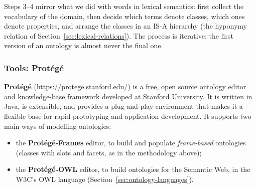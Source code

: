 \begin{nbintuition}
Steps 3--4 mirror what we did with words in lexical semantics: first collect the
vocabulary of the domain, then decide which terms denote classes, which ones denote
properties, and arrange the classes in an IS-A hierarchy (the hyponymy relation of
Section~\ref{sec:lexical-relations}). The process is iterative: the first version of an
ontology is almost never the final one.
\end{nbintuition}

\subsubsection{Tools: Protégé}

\textbf{Protégé} (\url{https://protege.stanford.edu/}) is a free, open source ontology
editor and knowledge-base framework developed at Stanford University. It is written in
Java, is extensible, and provides a plug-and-play environment that makes it a flexible
base for rapid prototyping and application development. It supports two main ways of
modelling ontologies:
\begin{itemize}[nosep]
  \item the \textbf{Protégé-Frames} editor, to build and populate \emph{frame-based}
        ontologies (classes with slots and facets, as in the methodology above);
  \item the \textbf{Protégé-OWL} editor, to build ontologies for the Semantic Web, in
        the W3C's OWL language (Section~\ref{sec:ontology-languages}).
\end{itemize}
